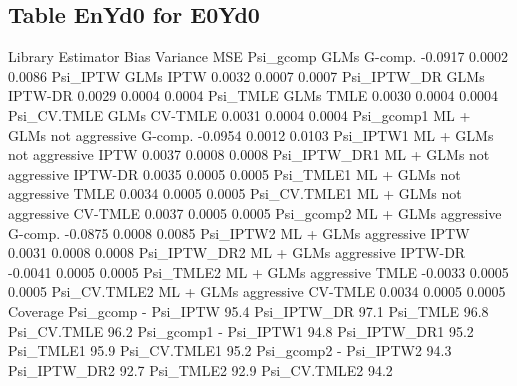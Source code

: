 \documentclass[11pt]{article}
\begin{document}
\subsection{Table EnYd0 for E0Yd0}
\begin{Schunk}
\begin{Soutput}
                              Library Estimator    Bias Variance    MSE
Psi_gcomp                        GLMs   G-comp. -0.0917   0.0002 0.0086
Psi_IPTW                         GLMs      IPTW  0.0032   0.0007 0.0007
Psi_IPTW_DR                      GLMs   IPTW-DR  0.0029   0.0004 0.0004
Psi_TMLE                         GLMs      TMLE  0.0030   0.0004 0.0004
Psi_CV.TMLE                      GLMs   CV-TMLE  0.0031   0.0004 0.0004
Psi_gcomp1   ML + GLMs not aggressive   G-comp. -0.0954   0.0012 0.0103
Psi_IPTW1    ML + GLMs not aggressive      IPTW  0.0037   0.0008 0.0008
Psi_IPTW_DR1 ML + GLMs not aggressive   IPTW-DR  0.0035   0.0005 0.0005
Psi_TMLE1    ML + GLMs not aggressive      TMLE  0.0034   0.0005 0.0005
Psi_CV.TMLE1 ML + GLMs not aggressive   CV-TMLE  0.0037   0.0005 0.0005
Psi_gcomp2       ML + GLMs aggressive   G-comp. -0.0875   0.0008 0.0085
Psi_IPTW2        ML + GLMs aggressive      IPTW  0.0031   0.0008 0.0008
Psi_IPTW_DR2     ML + GLMs aggressive   IPTW-DR -0.0041   0.0005 0.0005
Psi_TMLE2        ML + GLMs aggressive      TMLE -0.0033   0.0005 0.0005
Psi_CV.TMLE2     ML + GLMs aggressive   CV-TMLE  0.0034   0.0005 0.0005
             Coverage
Psi_gcomp           -
Psi_IPTW        95.4%
Psi_IPTW_DR     97.1%
Psi_TMLE        96.8%
Psi_CV.TMLE     96.2%
Psi_gcomp1          -
Psi_IPTW1       94.8%
Psi_IPTW_DR1    95.2%
Psi_TMLE1       95.9%
Psi_CV.TMLE1    95.2%
Psi_gcomp2          -
Psi_IPTW2       94.3%
Psi_IPTW_DR2    92.7%
Psi_TMLE2       92.9%
Psi_CV.TMLE2    94.2%
\end{Soutput}
\end{Schunk}
\end{document}
